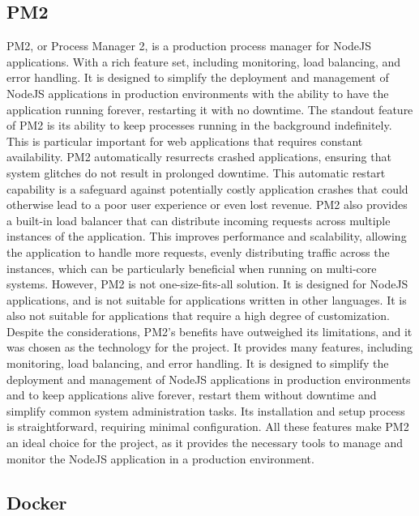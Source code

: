 \subsection{PM2}
PM2, or Process Manager 2, is a production process manager for NodeJS applications. With a rich feature set, including monitoring, load balancing, and error handling. It is designed to simplify the deployment and management of NodeJS applications in production environments with the ability to have 
the application running forever, restarting it with no downtime.
The standout feature of PM2 is its ability to keep processes running in the background indefinitely. This is particular important for web applications that requires constant availability. PM2 automatically resurrects crashed applications, ensuring that system glitches do not result in prolonged downtime.\cite{pm2}
This automatic restart capability is a safeguard against potentially costly application crashes that could otherwise lead to a poor user experience or even lost revenue. \cite{pm2}
PM2 also provides a built-in load balancer that can distribute incoming requests across multiple instances of the application. This improves performance and scalability, allowing the application to handle more requests, evenly distributing traffic across the instances, which can be particularly beneficial when running on multi-core systems. \cite{pm2LoadBalancing}
However, PM2 is not one-size-fits-all solution. It is designed for NodeJS applications, and is not suitable for applications written in other languages. It is also not suitable for applications that require a high degree of customization. \cite{pm2}
Despite the considerations, PM2's benefits have outweighed its limitations, and it was chosen as the technology for the project. It provides many features, including monitoring, load balancing, and error handling.
It is designed to simplify the deployment and management of NodeJS applications in production environments and to keep applications alive forever, restart them without downtime and simplify common system administration tasks.
Its installation and setup process is straightforward, requiring minimal configuration. 
All these features make PM2 an ideal choice for the project, as it provides the necessary tools to manage and monitor the NodeJS application in a production environment.\cite{tilkov}

\subsection{Docker}

